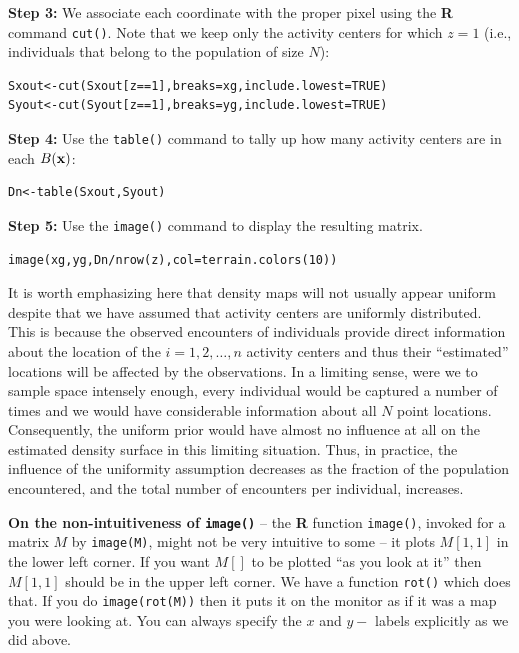{\flushleft \bf Step 3:} We associate each coordinate with the proper
pixel using the {\bf R} command \mbox{\tt cut()}. Note that we keep only
the activity centers for which $z=1$ (i.e., individuals that belong to
the population of size $N$):
\begin{verbatim}
Sxout<-cut(Sxout[z==1],breaks=xg,include.lowest=TRUE)
Syout<-cut(Syout[z==1],breaks=yg,include.lowest=TRUE)
\end{verbatim}

{\flushleft \bf Step 4:} Use the \mbox{\tt table()} command to tally
up how many activity centers are in each $B({\bf x})$:
\begin{verbatim}
Dn<-table(Sxout,Syout)
\end{verbatim}

{\flushleft \bf Step 5:} Use the \mbox{\tt image()} command to display
the resulting matrix.
\begin{verbatim}
image(xg,yg,Dn/nrow(z),col=terrain.colors(10))
\end{verbatim}

It is worth emphasizing here that density maps will not usually appear
uniform despite that we have assumed that activity centers are
uniformly distributed. This is because the observed encounters of
individuals provide direct information about the location of the
$i=1,2,\ldots,n$ activity centers and thus their ``estimated''
locations will be affected by the observations. In a limiting sense,
were we to sample space intensely enough, every individual would be
captured a number of times and we would have considerable information
about all $N$ point locations. Consequently, the uniform prior would
have almost no influence at all on the estimated density surface in
this limiting situation. Thus, in practice, the influence of the
uniformity assumption decreases as the fraction of the population
encountered, and the total number of encounters per individual, increases.

{\bf On the non-intuitiveness of \mbox{\tt image()} } -- the {\bf R}
function \mbox{\tt image()}, invoked for a matrix $M$ by \mbox{\tt image(M)}, might
not be very intuitive to some -- it plots $M[1,1]$ in the lower left
corner. If you want $M[]$ to be plotted ``as
you look at it'' then $M[1,1]$ should be in the upper left corner.  We
have a function \mbox{\tt rot()} which does that. If you do \mbox{\tt image(rot(M))} then it
puts it on the monitor as if it was a map you were looking at.  You
can always specify the $x$ and $y-$ labels explicitly as we did above.

